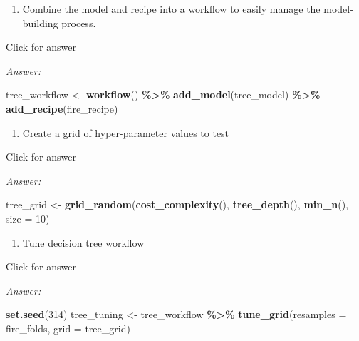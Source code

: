 \documentclass[
]{book}
\newenvironment{Shaded}{\begin{snugshade}}{\end{snugshade}}
\newcommand{\AttributeTok}[1]{\textcolor[rgb]{0.13,0.29,0.53}{#1}}
\newcommand{\DecValTok}[1]{\textcolor[rgb]{0.00,0.00,0.81}{#1}}
\newcommand{\FunctionTok}[1]{\textcolor[rgb]{0.13,0.29,0.53}{\textbf{#1}}}
\newcommand{\NormalTok}[1]{#1}
\newcommand{\OtherTok}[1]{\textcolor[rgb]{0.56,0.35,0.01}{#1}}
\newcommand{\SpecialCharTok}[1]{\textcolor[rgb]{0.81,0.36,0.00}{\textbf{#1}}}
\providecommand{\tightlist}{%
  \setlength{\itemsep}{0pt}\setlength{\parskip}{0pt}}
\begin{document}
\begin{enumerate}
\def\labelenumi{\alph{enumi}.}
\setcounter{enumi}{2}
\tightlist
\item
  Combine the model and recipe into a workflow to easily manage the model-building process.
\end{enumerate}

Click for answer

\emph{Answer:}

\begin{Shaded}
\begin{Highlighting}[]
\NormalTok{tree\_workflow }\OtherTok{\textless{}{-}} \FunctionTok{workflow}\NormalTok{() }\SpecialCharTok{\%\textgreater{}\%} 
                 \FunctionTok{add\_model}\NormalTok{(tree\_model) }\SpecialCharTok{\%\textgreater{}\%} 
                 \FunctionTok{add\_recipe}\NormalTok{(fire\_recipe)}
\end{Highlighting}
\end{Shaded}

\begin{enumerate}
\def\labelenumi{\alph{enumi}.}
\setcounter{enumi}{3}
\tightlist
\item
  Create a grid of hyper-parameter values to test
\end{enumerate}

Click for answer

\emph{Answer:}

\begin{Shaded}
\begin{Highlighting}[]
\NormalTok{tree\_grid }\OtherTok{\textless{}{-}} \FunctionTok{grid\_random}\NormalTok{(}\FunctionTok{cost\_complexity}\NormalTok{(),}
                          \FunctionTok{tree\_depth}\NormalTok{(),}
                          \FunctionTok{min\_n}\NormalTok{(), }
                          \AttributeTok{size =} \DecValTok{10}\NormalTok{)}
\end{Highlighting}
\end{Shaded}

\begin{enumerate}
\def\labelenumi{\alph{enumi}.}
\setcounter{enumi}{4}
\tightlist
\item
  Tune decision tree workflow
\end{enumerate}

Click for answer

\emph{Answer:}

\begin{Shaded}
\begin{Highlighting}[]
\FunctionTok{set.seed}\NormalTok{(}\DecValTok{314}\NormalTok{)}
\NormalTok{tree\_tuning }\OtherTok{\textless{}{-}}\NormalTok{ tree\_workflow }\SpecialCharTok{\%\textgreater{}\%} 
               \FunctionTok{tune\_grid}\NormalTok{(}\AttributeTok{resamples =}\NormalTok{ fire\_folds,}
                         \AttributeTok{grid =}\NormalTok{ tree\_grid)}
\end{Highlighting}
\end{Shaded}
\end{document}
